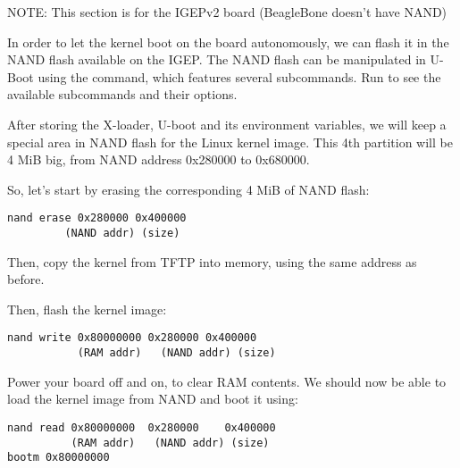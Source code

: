 NOTE: This section is for the IGEPv2 board (BeagleBone doesn't have NAND)

In order to let the kernel boot on the board autonomously, we can
flash it in the NAND flash available on the IGEP. The NAND flash can
be manipulated in U-Boot using the  command, which
features several subcommands. Run  to see the
available subcommands and their options.

After storing the X-loader, U-boot and its environment variables, we
will keep a special area in NAND flash for the Linux kernel image.
This 4th partition will be 4 MiB big, from NAND address
0x280000 to 0x680000.

So, let's start by erasing the corresponding 4 MiB of NAND flash:

\begin{verbatim}
nand erase 0x280000 0x400000
         (NAND addr) (size)
\end{verbatim}

Then, copy the kernel from TFTP into memory, using the same address as
before.

Then, flash the kernel image:

\begin{verbatim}
nand write 0x80000000 0x280000 0x400000
           (RAM addr)   (NAND addr) (size)
\end{verbatim}

Power your board off and on, to clear RAM contents. We should now be able to load
the kernel image from NAND and boot it using:

\begin{verbatim}
nand read 0x80000000  0x280000    0x400000
          (RAM addr)   (NAND addr) (size)
bootm 0x80000000
\end{verbatim}

